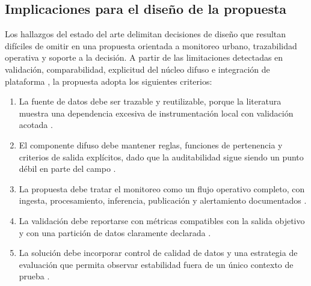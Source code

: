 \subsection{Implicaciones para el diseño de la propuesta}
Los hallazgos del estado del arte delimitan decisiones de diseño que resultan difíciles de omitir en una propuesta orientada a monitoreo urbano, trazabilidad operativa y soporte a la decisión. A partir de las limitaciones detectadas en validación, comparabilidad, explicitud del núcleo difuso e integración de plataforma \cite{ART01,ART02,A084,A114,A135,A167}, la propuesta adopta los siguientes criterios:
\begin{enumerate}
\item La fuente de datos debe ser trazable y reutilizable, porque la literatura muestra una dependencia excesiva de instrumentación local con validación acotada \cite{A028,A084,A135}.
\item El componente difuso debe mantener reglas, funciones de pertenencia y criterios de salida explícitos, dado que la auditabilidad sigue siendo un punto débil en parte del campo \cite{ART05,ART06,A084,A167}.
\item La propuesta debe tratar el monitoreo como un flujo operativo completo, con ingesta, procesamiento, inferencia, publicación y alertamiento documentados \cite{A114,A165,A167}.
\item La validación debe reportarse con métricas compatibles con la salida objetivo y con una partición de datos claramente declarada \cite{ART01,ART02,A028,A135}.
\item La solución debe incorporar control de calidad de datos y una estrategia de evaluación que permita observar estabilidad fuera de un único contexto de prueba \cite{A084,ART08}.
\end{enumerate}


